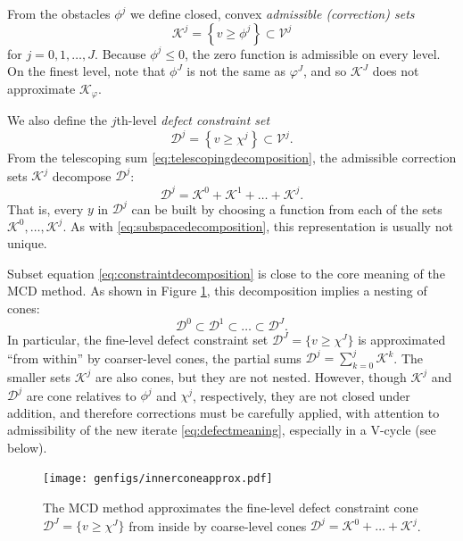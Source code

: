 \documentclass[letterpaper,final,12pt,reqno]{amsart}
\theoremstyle{claim}
\numberwithin{equation}{section}
\numberwithin{figure}{section}
\numberwithin{table}{section}
\numberwithin{theorem}{section}
\begin{document}
From the obstacles $\phi^j$ we define closed, convex \emph{admissible (correction) sets}
\begin{equation}
\mathcal{K}^j = \left\{v \ge \phi^j\right\} \subset \mathcal{V}^j \label{eq:defineKj}
\end{equation}
for $j=0,1,\dots,J$.  Because $\phi^j \le 0$, the zero function is admissible on every level.  On the finest level, note that $\phi^J$ is not the same as $\varphi^J$, and so $\mathcal{K}^J$ does not approximate $\mathcal{K}_\varphi$.

We also define the $j$th-level \emph{defect constraint set}
\begin{equation}
  \mathcal{D}^j = \left\{v \ge \chi^j\right\} \subset \mathcal{V}^j.  \label{eq:constraintset}
\end{equation}
From the telescoping sum \eqref{eq:telescopingdecomposition}, the admissible correction sets $\mathcal{K}^j$ decompose $\mathcal{D}^j$:
\begin{equation}
  \mathcal{D}^j = \mathcal{K}^0 + \mathcal{K}^1 + \dots + \mathcal{K}^j. \label{eq:constraintdecomposition}
\end{equation}
That is, every $y$ in $\mathcal{D}^j$ can be built by choosing a function from each of the sets $\mathcal{K}^0,\dots,\mathcal{K}^j$.  As with \eqref{eq:subspacedecomposition}, this representation is usually not unique.

Subset equation \eqref{eq:constraintdecomposition} is close to the core meaning of the MCD method.  As shown in Figure \ref{fig:innerconeapprox}, this decomposition implies a nesting of cones:
\begin{equation}
  \mathcal{D}^0 \subset \mathcal{D}^1 \subset \dots \subset \mathcal{D}^J.  \label{eq:nestedcones}
\end{equation}
In particular, the fine-level defect constraint set $\mathcal{D}^J = \{v \ge \chi^J\}$ is approximated ``from within'' by coarser-level cones, the partial sums $\mathcal{D}^j = \sum_{k=0}^j \mathcal{K}^k$.  The smaller sets $\mathcal{K}^j$ are also cones, but they are not nested.  However, though $\mathcal{K}^j$ and $\mathcal{D}^j$ are cone relatives to $\phi^j$ and $\chi^j$, respectively, they are not closed under addition, and therefore corrections must be carefully applied, with attention to admissibility of the new iterate \eqref{eq:defectmeaning}, especially in a V-cycle (see below).

\begin{figure}
\texttt{[image: genfigs/innerconeapprox.pdf]}

\caption{The MCD method approximates the fine-level defect constraint cone $\mathcal{D}^J = \{v\ge \chi^J\}$ from inside by coarse-level cones $\mathcal{D}^j=\mathcal{K}^0+\dots+\mathcal{K}^j$.}
\label{fig:innerconeapprox}
\end{figure}
\end{document}
